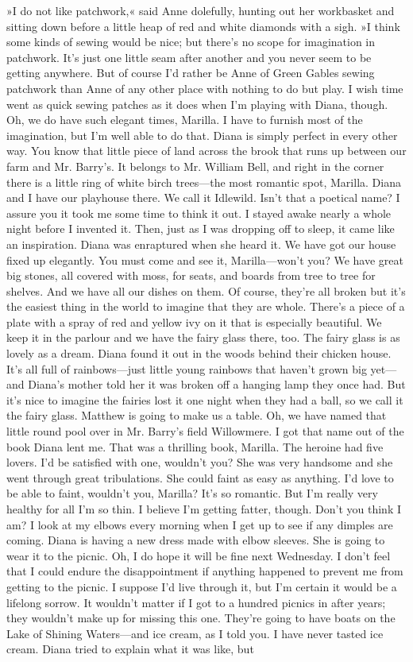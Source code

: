 »I do not like patchwork,« said Anne dolefully, hunting out her workbasket and sitting down before a little heap of red and white diamonds with a sigh. »I think some kinds of sewing would be nice; but there's no scope for imagination in patchwork. It's just one little seam after another and you never seem to be getting anywhere. But of course I'd rather be Anne of Green Gables sewing patchwork than Anne of any other place with nothing to do but play. I wish time went as quick sewing patches as it does when I'm playing with Diana, though. Oh, we do have such elegant times, Marilla. I have to furnish most of the imagination, but I'm well able to do that. Diana is simply perfect in every other way. You know that little piece of land across the brook that runs up between our farm and Mr. Barry's. It belongs to Mr. William Bell, and right in the corner there is a little ring of white birch trees—the most romantic spot, Marilla. Diana and I have our playhouse there. We call it Idlewild. Isn't that a poetical name? I assure you it took me some time to think it out. I stayed awake nearly a whole night before I invented it. Then, just as I was dropping off to sleep, it came like an inspiration. Diana was enraptured when she heard it. We have got our house fixed up elegantly. You must come and see it, Marilla—won't you? We have great big stones, all covered with moss, for seats, and boards from tree to tree for shelves. And we have all our dishes on them. Of course, they're all broken but it's the easiest thing in the world to imagine that they are whole. There's a piece of a plate with a spray of red and yellow ivy on it that is especially beautiful. We keep it in the parlour and we have the fairy glass there, too. The fairy glass is as lovely as a dream. Diana found it out in the woods behind their chicken house. It's all full of rainbows—just little young rainbows that haven't grown big yet—and Diana's mother told her it was broken off a hanging lamp they once had. But it's nice to imagine the fairies lost it one night when they had a ball, so we call it the fairy glass. Matthew is going to make us a table. Oh, we have named that little round pool over in Mr. Barry's field Willowmere. I got that name out of the book Diana lent me. That was a thrilling book, Marilla. The heroine had five lovers. I'd be satisfied with one, wouldn't you? She was very handsome and she went through great tribulations. She could faint as easy as anything. I'd love to be able to faint, wouldn't you, Marilla? It's so romantic. But I'm really very healthy for all I'm so thin. I believe I'm getting fatter, though. Don't you think I am? I look at my elbows every morning when I get up to see if any dimples are coming. Diana is having a new dress made with elbow sleeves. She is going to wear it to the picnic. Oh, I do hope it will be fine next Wednesday. I don't feel that I could endure the disappointment if anything happened to prevent me from getting to the picnic. I suppose I'd live through it, but I'm certain it would be a lifelong sorrow. It wouldn't matter if I got to a hundred picnics in after years; they wouldn't make up for missing this one. They're going to have boats on the Lake of Shining Waters—and ice cream, as I told you. I have never tasted ice cream. Diana tried to explain what it was like, but 
